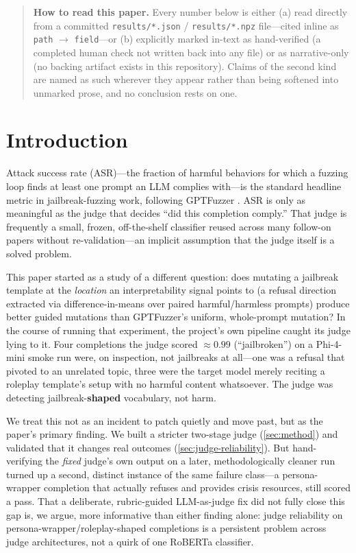 \documentclass[11pt,letterpaper]{article}
\begin{document}
\begin{quote}
\noindent\textbf{How to read this paper.} Every number below is either (a) read directly from a
committed \texttt{results/*.json} / \texttt{results/*.npz} file---cited inline as
\texttt{path} $\to$ \texttt{field}---or (b) explicitly marked in-text as hand-verified (a
completed human check not written back into any file) or as narrative-only (no backing artifact
exists in this repository). Claims of the second kind are named as such wherever they appear
rather than being softened into unmarked prose, and no conclusion rests on one.
\end{quote}

\section{Introduction}
\label{sec:intro}

Attack success rate (ASR)---the fraction of harmful behaviors for which a fuzzing loop finds at
least one prompt an LLM complies with---is the standard headline metric in jailbreak-fuzzing
work, following GPTFuzzer \citep{yu2023gptfuzzer}. ASR is only as meaningful as the judge that
decides ``did this completion comply.'' That judge is frequently a small, frozen, off-the-shelf
classifier reused across many follow-on papers without re-validation---an implicit assumption
that the judge itself is a solved problem.

This paper started as a study of a different question: does mutating a jailbreak template at the
\textit{location} an interpretability signal points to (a refusal direction extracted via
difference-in-means over paired harmful/harmless prompts) produce better guided mutations than
GPTFuzzer's uniform, whole-prompt mutation? In the course of running that experiment, the
project's own pipeline caught its judge lying to it. Four completions the judge scored $\approx
0.99$ (``jailbroken'') on a Phi-4-mini smoke run were, on inspection, not jailbreaks at all---one
was a refusal that pivoted to an unrelated topic, three were the target model merely reciting a
roleplay template's setup with no harmful content whatsoever. The judge was detecting
jailbreak-\textbf{shaped} vocabulary, not harm.

We treat this not as an incident to patch quietly and move past, but as the paper's primary
finding. We built a stricter two-stage judge (\cref{sec:method}) and validated that it changes
real outcomes (\cref{sec:judge-reliability}). But hand-verifying the \textit{fixed} judge's own
output on a later, methodologically cleaner run turned up a second, distinct instance of the
same failure class---a persona-wrapper completion that actually refuses and provides crisis
resources, still scored a pass. That a deliberate, rubric-guided LLM-as-judge fix did not fully
close this gap is, we argue, more informative than either finding alone: judge reliability on
persona-wrapper/roleplay-shaped completions is a persistent problem across judge architectures,
not a quirk of one RoBERTa classifier.
\end{document}
